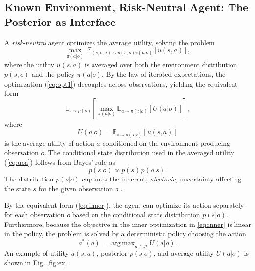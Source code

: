 \documentclass[journal]{IEEEtran}
\theoremstyle{definition}
\theoremstyle{remark}
\newcommand{\E}{\mathbb{E}}
\newcommand{\Aset}{\mathcal{A}}
\DeclareMathOperator*{\argmax}{arg\,max}
\begin{document}
\subsection{Known Environment, Risk-Neutral Agent: The Posterior as Interface}
\label{sec:known}
A \emph{risk-neutral} agent optimizes the average utility, solving the problem
\begin{equation}\label{eq:opt1}
\max_{\pi(a| o)}\ \E_{(s,o,a)\sim p(s,o)\pi(a| o)}\!\left[u(s,a)\right],
\end{equation} where the utility $u(s,a)$ is averaged over both the environment distribution $p(s,o)$ and the policy $\pi(a|o)$. 
By the law of iterated expectations, the optimization (\ref{eq:opt1}) decouples across
observations, yielding the equivalent form \begin{equation}\label{eq:inner}
\E_{o\sim p(o)}\!\left[\max_{\pi(a| o)} \E_{a\sim \pi(a|o)}[U(a| o)]\right],
\end{equation} where
\begin{equation}\label{eq:uoa}
U(a| o)=\E_{s\sim p(s| o)}\!\left[u(s,a)\right]
\end{equation}
is the average utility of action $a$ conditioned on the environment producing
observation $o$. The conditional state distribution used in the averaged utility (\ref{eq:uoa}) follows from Bayes' rule as
\begin{equation}
\label{eq:posterior}
p(s| o)\propto p(s)\,p(o| s).
\end{equation}  { The distribution $p(s|o)$ captures the inherent, \emph{aleatoric}, uncertainty affecting the state $s$ for the given observation $o$ \cite{simeone2022ml}. }

By the equivalent form (\ref{eq:inner}), the agent can optimize its action separately for each observation $o$ based on the conditional state distribution $p(s|o)$. Furthermore, because the objective in the inner optimization in \eqref{eq:inner} is linear in the policy, the problem 
is solved by a deterministic policy choosing the action
\begin{equation}\label{eq:optaction}
a^*(o)=\argmax_{a \in \Aset} U(a| o).
\end{equation} An example of utility $u(s,a)$, posterior $p(s|o)$, and average utility $U(a|o)$ is shown in Fig. \ref{fig:ex}.
\end{document}
